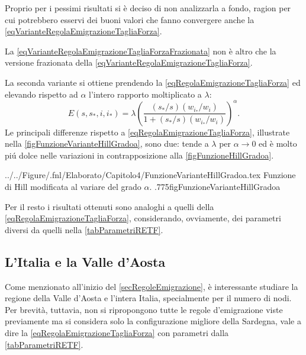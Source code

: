       \begin{oss}
        Proprio per i pessimi risultati si è deciso di non analizzarla a fondo, ragion per cui potrebbero esservi dei buoni valori che fanno convergere anche la \cref{eqVarianteRegolaEmigrazioneTagliaForza}.
      \end{oss}

      \begin{oss}
        La \cref{eqVarianteRegolaEmigrazioneTagliaForzaFrazionata} non è altro che la versione frazionata della \cref{eqVarianteRegolaEmigrazioneTagliaForza}.
      \end{oss}

      La seconda variante si ottiene prendendo la \ref{eqRegolaEmigrazioneTagliaForza} ed elevando rispetto ad \(\alpha\) l'intero rapporto moltiplicato a \(\lambda\):
      \begin{equation}
        \label{eqRegolaEmigrazioneTagliaForzaVarianteHill}
        E(s,s_*,i,i_*)=\lambda\left(
          \frac{(s_*/s)(w_{i_*}/w_i)}{1+(s_*/s)(w_{i_*}/w_i)}
        \right)^\alpha.
      \end{equation}
      Le principali differenze rispetto a \ref{eqRegolaEmigrazioneTagliaForza}, illustrate nella \cref{figFunzioneVarianteHillGradoa}, sono due: tende a \(\lambda\) per \(\alpha\to0\) ed è molto piú dolce nelle variazioni in contrapposizione alla \cref{figFunzioneHillGradoa}.

        {../../Figure/.fnl/Elaborato/Capitolo4/FunzioneVarianteHillGradoa.tex}
        {Funzione di Hill modificata al variare del grado \(\alpha\).}
        {.775\linewidth}{figFunzioneVarianteHillGradoa}

      Per il resto i risultati ottenuti sono analoghi a quelli della \ref{eqRegolaEmigrazioneTagliaForza}, considerando, ovviamente, dei parametri diversi da quelli nella \cref{tabParametriRETF}.

    \subsection{L'Italia e la Valle d'Aosta}\label{secItaliaValleDAosta}

      Come menzionato all'inizio del \cref{secRegoleEmigrazione}, è interessante studiare la regione della Valle d'Aosta e l'intera Italia, specialmente per il numero di nodi. Per brevità, tuttavia, non si ripropongono tutte le regole d'emigrazione viste previamente ma si considera solo la configurazione migliore della Sardegna, vale a dire la \ref{eqRegolaEmigrazioneTagliaForza} con parametri dalla \cref{tabParametriRETF}.
      
